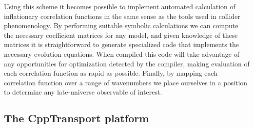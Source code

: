 \documentclass[11pt,a4paper]{article}
\newcommand{\packagefont}{\sffamily}
\newcommand{\CppTransport}{{\packagefont CppTransport}}
\begin{document}
Using this scheme it becomes possible to implement automated
calculation of inflationary correlation functions in the same sense
as the tools used in collider phenomenology.
By performing suitable symbolic calculations we can
compute the necessary coefficient matrices for any model,
and given knowledge of these matrices it is straightforward to generate
specialized code that implements the necessary evolution equations.
When compiled this code will take advantage of any opportunities for
optimization detected by the compiler, making evaluation of
each correlation function as rapid as possible.
Finally, by
mapping each correlation function over a range of wavenumbers we
place ourselves in a position to determine any
late-universe observable of interest.

\subsection{The {\CppTransport} platform}
\end{document}
